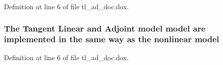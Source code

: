 Definition at line 6 of file tl\-\_\-ad\-\_\-doc.\-dox.

\hypertarget{tl__ad__doc_8dox_a23bc61c4c5b98896f5092dfa5afc601c}{
\subsubsection[{model}]{\setlength{\rightskip}{0pt plus 5cm}The Tangent {\bf Linear} and Adjoint model model are implemented in the same way as the nonlinear model}}\label{tl__ad__doc_8dox_a23bc61c4c5b98896f5092dfa5afc601c}


Definition at line 6 of file tl\-\_\-ad\-\_\-doc.\-dox.

